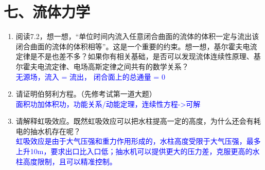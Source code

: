 \documentclass[12pt,a4paper]{article}
\begin{document}
\section{七、流体力学}
\begin{enumerate}[label=\arabic*.,leftmargin=*]
    \item 阅读7.2，想一想，“单位时间内流入任意闭合曲面的流体的体积一定与流出该闭合曲面的流体的体积相等”。这是一个重要的约束。想一想，基尔霍夫电流定律是不是也差不多？如果你有相关基础，是否可以发现流体连续性原理、基尔霍夫电流定律、电场高斯定律之间共有的数学关系？
\textcolor{blue}{\\无源场，流入 = 流出，
闭合面上的总通量 = 0}
    \item 请证明伯努利方程。（先修考试第一道大题）
\textcolor{blue}{\\面积功加体积功，功能关系/动能定理，连续性方程->可解}
    \item 请解释虹吸效应。既然虹吸效应可以把水柱提高一定的高度，为什么还会有耗电的抽水机存在呢？
\textcolor{blue}{\\虹吸效应是由于大气压强和重力作用形成的，水柱高度受限于大气压强，最多上升10m，要求出口比入口低；抽水机可以提供更大的压力差，克服更高的水柱高度限制，且可以精准控制。}
\end{enumerate}
\end{document}
